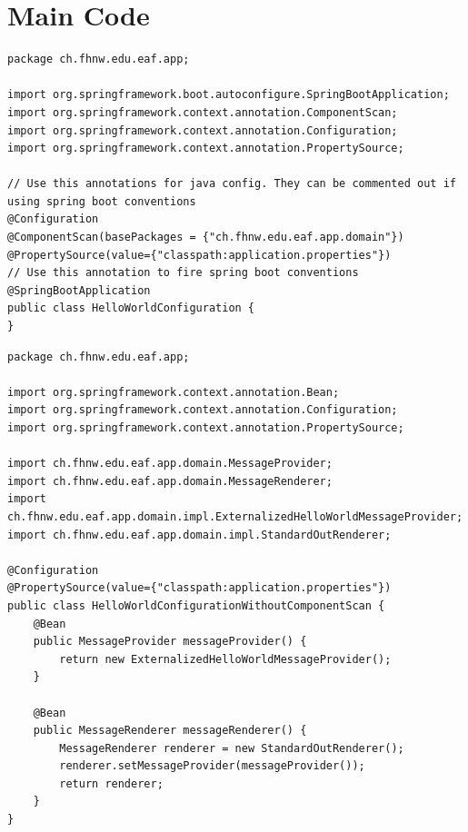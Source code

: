 \documentclass[a4paper,10pt]{scrreprt}
\begin{document}
\section{Main Code}
\begin{lstlisting}[caption=HelloWorldConfiguration.java]	
package ch.fhnw.edu.eaf.app;

import org.springframework.boot.autoconfigure.SpringBootApplication;
import org.springframework.context.annotation.ComponentScan;
import org.springframework.context.annotation.Configuration;
import org.springframework.context.annotation.PropertySource;

// Use this annotations for java config. They can be commented out if using spring boot conventions
@Configuration
@ComponentScan(basePackages = {"ch.fhnw.edu.eaf.app.domain"})
@PropertySource(value={"classpath:application.properties"})
// Use this annotation to fire spring boot conventions
@SpringBootApplication
public class HelloWorldConfiguration {
}
\end{lstlisting}
\begin{lstlisting}[caption=HelloWorldConfigurationWithoutConfiguration.java]
package ch.fhnw.edu.eaf.app;

import org.springframework.context.annotation.Bean;
import org.springframework.context.annotation.Configuration;
import org.springframework.context.annotation.PropertySource;

import ch.fhnw.edu.eaf.app.domain.MessageProvider;
import ch.fhnw.edu.eaf.app.domain.MessageRenderer;
import ch.fhnw.edu.eaf.app.domain.impl.ExternalizedHelloWorldMessageProvider;
import ch.fhnw.edu.eaf.app.domain.impl.StandardOutRenderer;

@Configuration
@PropertySource(value={"classpath:application.properties"})
public class HelloWorldConfigurationWithoutComponentScan {
    @Bean
    public MessageProvider messageProvider() {
        return new ExternalizedHelloWorldMessageProvider();
    }

    @Bean
    public MessageRenderer messageRenderer() {
        MessageRenderer renderer = new StandardOutRenderer();
        renderer.setMessageProvider(messageProvider());
        return renderer;
    }
}
	
\end{lstlisting}
\end{document}
